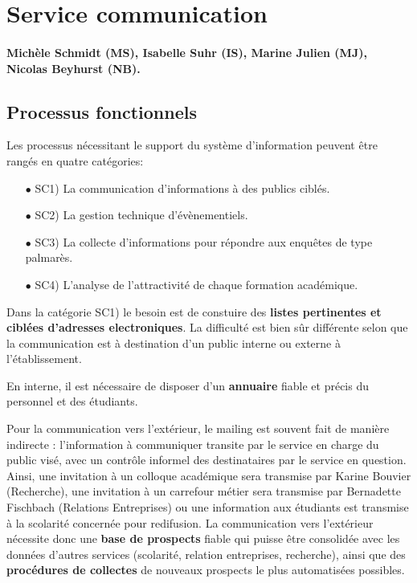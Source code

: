 \documentclass{book}
\begin{document}
\section{Service communication}

\paragraph{Michèle Schmidt (MS), Isabelle Suhr (IS), Marine Julien (MJ), 
Nicolas Beyhurst (NB).}

\subsection{Processus fonctionnels}
Les processus nécessitant le support du système d'information peuvent 
être rangés en quatre catégories:
\begin{itemize}
\item[$\bullet$] SC1) La communication d'informations à des publics ciblés.
\item[$\bullet$] SC2) La gestion technique d'évènementiels.
\item[$\bullet$] SC3) La collecte d'informations pour répondre aux enquêtes de type 
      palmarès.
\item[$\bullet$] SC4) L'analyse de l'attractivité de chaque formation académique.
\end{itemize}
\bigskip

Dans la catégorie SC1) le besoin est de constuire des \textbf{listes 
pertinentes et ciblées d'adresses electroniques}. La difficulté
est bien sûr différente selon que la communication est à destination
d'un public interne ou externe à l'établissement.

En interne, il est nécessaire de disposer d'un \textbf{annuaire}
fiable et précis du personnel et des étudiants. 

Pour la communication vers l'extérieur, le mailing est souvent 
fait de manière indirecte : l'information à communiquer transite par
le service en charge du public visé, avec un contrôle informel des 
destinataires par le service en question. Ainsi, une invitation à un 
colloque académique sera transmise par Karine Bouvier (Recherche),
une invitation à un carrefour métier sera transmise par Bernadette 
Fischbach (Relations Entreprises) ou une information aux étudiants
est transmise à la scolarité concernée pour redifusion. La communication 
vers l'extérieur nécessite donc une \textbf{base de prospects} fiable 
qui puisse être consolidée avec les données d'autres services (scolarité, 
relation entreprises, recherche), ainsi que des \textbf{procédures 
de collectes} de nouveaux prospects le plus automatisées possibles.\\
\end{document}
